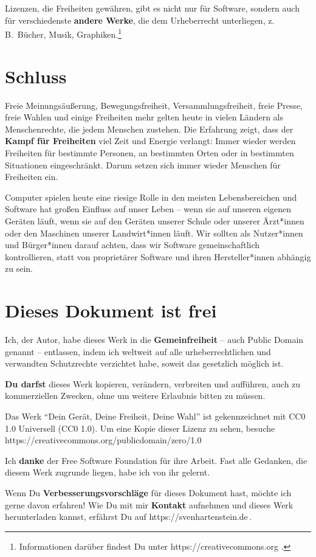 \documentclass[a5paper,12pt]{scrartcl}
\begin{document}
Lizenzen, die Freiheiten gewähren, gibt es nicht nur für Software,
sondern auch für verschiedenste \textbf{andere Werke}, die dem
Urheberrecht unterliegen, z.\,B.\ Bücher, Musik,
Graphiken.\footnote{Informationen darüber findest Du unter
  https://creativecommons.org .}


\section{Schluss}

Freie Meinungsäußerung, Bewegungsfreiheit, Versammlungsfreiheit, freie
Presse, freie Wahlen und einige Freiheiten mehr gelten heute in vielen
Ländern als Menschenrechte, die jedem Menschen zustehen. Die Erfahrung
zeigt, dass der \textbf{Kampf für Freiheiten} viel Zeit und Energie
verlangt: Immer wieder werden Freiheiten für bestimmte Personen, an
bestimmten Orten oder in bestimmten Situationen eingeschränkt. Darum
setzen sich immer wieder Menschen für Freiheiten ein.

Computer spielen heute eine riesige Rolle in den meisten
Lebensbereichen und Software hat großen Einfluss auf unser Leben --
wenn sie auf unseren eigenen Geräten läuft, wenn sie auf den Geräten
unserer Schule oder unserer Ärzt*innen oder den Maschinen unserer
Landwirt*innen läuft. Wir sollten als Nutzer*innen und Bürger*innen
darauf achten, dass wir Software gemeinschaftlich kontrollieren, statt
von proprietärer Software und ihren Hersteller*innen abhängig zu sein.


\section{Dieses Dokument ist frei}

Ich, der Autor, habe dieses Werk in die \textbf{Gemeinfreiheit} --
auch Public Domain genannt -- entlassen, indem ich weltweit auf alle
urheberrechtlichen und verwandten Schutzrechte verzichtet habe, soweit
das gesetzlich möglich ist.

\textbf{Du darfst} dieses Werk kopieren, verändern, verbreiten und
aufführen, auch zu kommerziellen Zwecken, ohne um weitere Erlaubnis
bitten zu müssen.

Das Werk "`Dein Gerät, Deine Freiheit, Deine Wahl"' %
ist gekennzeichnet mit CC0 1.0 Universell (CC0
1.0). Um eine Kopie dieser Lizenz zu sehen,
besuche\\
https://creativecommons.org/publicdomain/zero/1.0

Ich \textbf{danke} der Free Software Foundation für ihre Arbeit. Fast
alle Gedanken, die diesem Werk zugrunde liegen, habe ich von ihr
gelernt.

Wenn Du \textbf{Verbesserungsvorschläge} für dieses Dokument hast,
möchte ich gerne davon erfahren! Wie Du mit mir \textbf{Kontakt}
aufnehmen und dieses Werk herunterladen kannst, erfährst Du auf
https://svenhartenstein.de\,.
\end{document}
